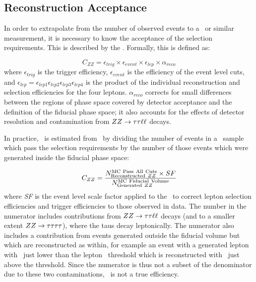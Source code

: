 \subsection{Reconstruction Acceptance \CZZ}
\label{sec:objSel-CZZ}

In order to extrapolate from the number of observed events to a \cx\ or similar
measurement, it is necessary to know the acceptance of the selection
requirements. This is described by the . Formally, this is defined as:

\begin{equation}
C_{ZZ}= \epsilon_{trig} \times \epsilon_{event} \times \epsilon_{lep} \times \alpha_{reco}
\end{equation}
where $\epsilon_{trig}$ is the trigger efficiency, $\epsilon_{event}$ is 
the efficiency of the event level cuts, and
$\epsilon_{lep} =\epsilon_{lep1}\epsilon_{lep2}\epsilon_{lep3}\epsilon_{lep4}$ is the product of the 
individual reconstruction and selection efficiencies for the four leptons. 
$\alpha_{reco}$ corrects for small differences between the
regions of phase space covered by detector acceptance and the definition of the
fiducial phase space; it also accounts for the effects of detector resolution and
contamination from $ZZ\rightarrow\tau\tau\ell\ell$ decays.

In practice, \CZZ\ is estimated from \mc\ by dividing the number of events in a
\ZZllll\ sample which pass the selection requirements by the number of those events
which were generated inside the fiducial phase space:

\begin{equation}
C_{ZZ}= \frac{ N^{\rm MC\ Pass\ All\ Cuts}_{{\rm Reconstructed}\ ZZ} \times
SF }{ N^{{\rm MC\ Fiducial\ Volume}}_{{\rm Generated}\ ZZ} }
\end{equation}
where {\it SF} is the event level scale factor applied to the \mc\ to correct
lepton selection efficiencies and trigger efficiencies to those observed in
data. The number in the numerator includes contributions from
$ZZ\rightarrow\tau\tau\ell\ell$ decays (and to a smaller extent
$ZZ\rightarrow\tau\tau\tau\tau$), where the taus decay leptonically. The numerator also
includes a contribution from events generated outside the fiducial volume but
which are reconstructed as within, for example an event with a generated lepton
with \pt\ just lower than the lepton \pt\ threshold which is reconstructed
with \pt\ just above the threshold. Since the numerator is thus not a subset of
the denominator due to these two contaminations, \CZZ\ is not a true efficiency. 

